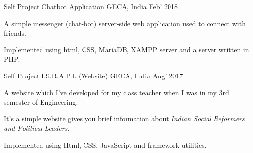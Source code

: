 

\begin{cventries}

  \cventry
    {Self Project}  
    {Chatbot Application} %
    {GECA, India} %
    {Feb’ 2018} %
    {
      \begin{cvitems} %
      	\item {A simple messenger (chat-bot) server-side web application used to connect with friends.}
        \item {Implemented using html, CSS, MariaDB, XAMPP server and a server written in PHP.} 
      \end{cvitems}
    }

  \cventry
    {Self Project} %
    {I.S.R.A.P.L (Website)} %
    {GECA, India} %
    {Aug’ 2017} %
    {
      \begin{cvitems} %
        \item {A website which I’ve developed for my class teacher when I was in my 3rd semester of Engineering.}
        \item {It’s a simple website gives you brief information about {\em Indian Social Reformers and Political Leaders}.}
        \item {Implemented using Html, CSS, JavaScript and framework utilities.}
      \end{cvitems}
    }
\end{cventries}
